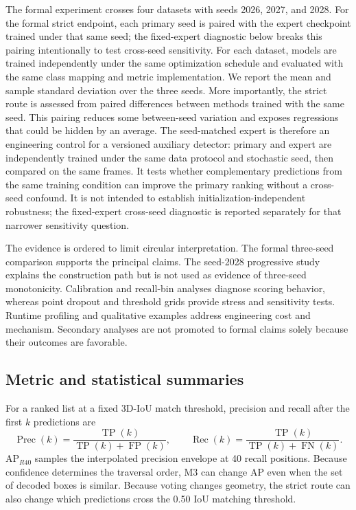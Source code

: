 \documentclass[preprint,12pt,times]{elsarticle}
\begin{document}
The formal experiment crosses four datasets with seeds 2026, 2027, and 2028.
For the formal strict endpoint, each primary seed is paired with the expert
checkpoint trained under that same seed; the fixed-expert diagnostic below
breaks this pairing intentionally to test cross-seed sensitivity. For each
dataset, models are trained independently under the same optimization schedule
and evaluated with the same class mapping and metric implementation.
We report the mean and sample standard deviation over the three seeds. More
importantly, the strict route is assessed from paired differences between
methods trained with the same seed. This pairing reduces some between-seed
variation and exposes regressions that could be hidden by an average.
The seed-matched expert is therefore an engineering control for a versioned
auxiliary detector: primary and expert are independently trained under the
same data protocol and stochastic seed, then compared on the same frames. It
tests whether complementary predictions from the same training condition can
improve the primary ranking without a cross-seed confound. It is not intended
to establish initialization-independent robustness; the fixed-expert
cross-seed diagnostic is reported separately for that narrower sensitivity
question.

The evidence is ordered to limit circular interpretation. The formal
three-seed comparison supports the principal claims. The seed-2028 progressive
study explains the construction path but is not used as evidence of three-seed
monotonicity. Calibration and recall-bin analyses diagnose scoring behavior,
whereas point dropout and threshold grids provide stress and sensitivity tests.
Runtime profiling and qualitative examples address engineering cost and
mechanism. Secondary analyses are not promoted to formal claims solely because
their outcomes are favorable.

\subsection{Metric and statistical summaries}

For a ranked list at a fixed 3D-IoU match threshold, precision and recall after
the first $k$ predictions are
\begin{equation}
\operatorname{Prec}(k)=\frac{\operatorname{TP}(k)}
{\operatorname{TP}(k)+\operatorname{FP}(k)},\qquad
\operatorname{Rec}(k)=\frac{\operatorname{TP}(k)}
{\operatorname{TP}(k)+\operatorname{FN}(k)}.
\end{equation}
AP$_{R40}$ samples the interpolated precision envelope at 40 recall positions.
Because confidence determines the traversal order, M3 can change AP even when
the set of decoded boxes is similar. Because voting changes geometry, the
strict route can also change which predictions cross the 0.50 IoU matching
threshold.
\end{document}
